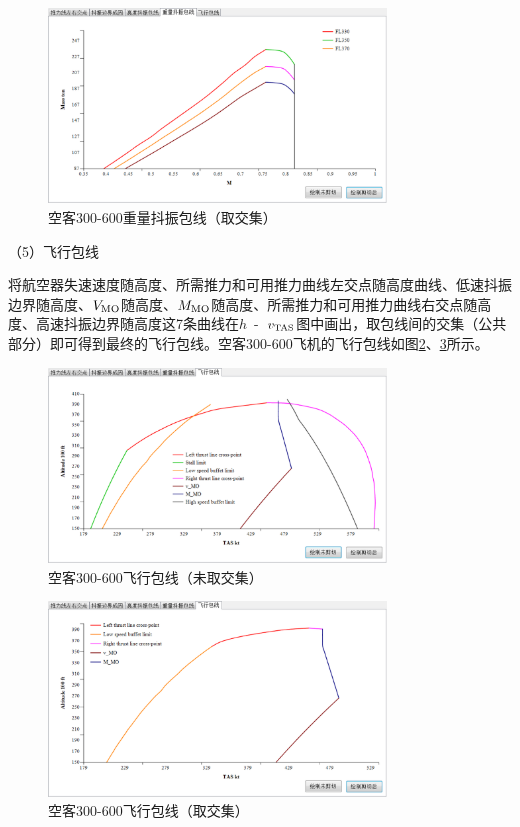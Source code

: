 \documentclass[a4paper,punct,space,heading=true,AutoFakeBold]{ctexrep}
\begin{document}
\begin{figure}[h]
	\centering
	\includegraphics[width=0.8\textwidth]{pic/buffetlimitwithWtrim.eps}\hspace{30pt}
	\caption{空客300-600重量抖振包线（取交集）}\label{buffetlimitwithWtrim}
\end{figure}


（5）飞行包线

将航空器失速速度随高度、所需推力和可用推力曲线左交点随高度曲线、低速抖振边界随高度、$V_{\rm MO}$随高度、$M_{\rm MO}$随高度、所需推力和可用推力曲线右交点随高度、高速抖振边界随高度这7条曲线在$h$\ -\ $v_{\rm TAS}$图中画出，取包线间的交集（公共部分）即可得到最终的飞行包线。空客300-600飞机的飞行包线如图\ref{flightenvelopewithouttrim}、\ref{flightenvelopetrim}所示。

\begin{figure}[H]
	\centering
	\includegraphics[width=0.8\textwidth]{pic/flightenvelopewithouttrim.eps}\hspace{30pt}
	\caption{空客300-600飞行包线（未取交集）}\label{flightenvelopewithouttrim}
\end{figure}

\begin{figure}[H]
	\centering
	\includegraphics[width=0.8\textwidth]{pic/flightenvelopetrim.eps}\hspace{30pt}
	\caption{空客300-600飞行包线（取交集）}\label{flightenvelopetrim}
\end{figure}
\end{document}
